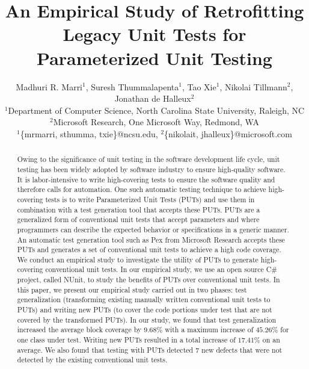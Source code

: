 \documentclass{sig-alternate}
\begin{document}
\title{An Empirical Study of Retrofitting Legacy Unit Tests for Parameterized Unit Testing}

\author{Madhuri R. Marri$^1$, Suresh Thummalapenta$^1$, Tao Xie$^1$, Nikolai Tillmann$^2$, Jonathan de Halleux$^2$\\
\small{$^1$Department of Computer Science, North Carolina State University, Raleigh, NC}\\
\small{$^2$Microsoft Research, One Microsoft Way, Redmond, WA}\\
\small{$^1$\{mrmarri, sthumma, txie\}@ncsu.edu, $^2$\{nikolait, jhalleux\}@microsoft.com}\\}
\maketitle
\begin{abstract}
Owing to the significance of unit testing in the software development life cycle, unit testing has been widely adopted by software industry to ensure high-quality software. It is labor-intensive to write high-covering tests to ensure the software quality and therefore calls for automation. One such automatic testing technique to achieve high-covering tests is to write Parameterized Unit Tests (PUTs) and use them in combination with a test generation tool that accepts these PUTs. PUTs are a generalized form of conventional unit tests that accept parameters and where programmers can describe the expected behavior or
specifications in a generic manner. An automatic test generation tool such as Pex from Microsoft Research accepts these PUTs and generates a set of conventional unit tests to achieve a high code coverage. We conduct an empirical study to investigate the utility of PUTs to generate high-covering conventional unit tests. In our empirical study, we use an open source C\# project, called NUnit, to study 
the benefits of PUTs over conventional unit tests. In this paper, we present our empirical study carried out in two phases: test generalization (transforming existing manually written conventional unit tests to PUTs) and writing new PUTs (to cover the code portions under test that are not covered by the transformed PUTs). In our study, we found that test generalization increased the average block coverage by $9.68$\% with a maximum increase of $45.26\%$ for one class under test. Writing new PUTs resulted in a total increase of $17.41$\% on an average. We also found that testing with PUTs detected $7$ new defects that were not detected by the existing conventional unit tests.
\end{abstract}
\end{document}
